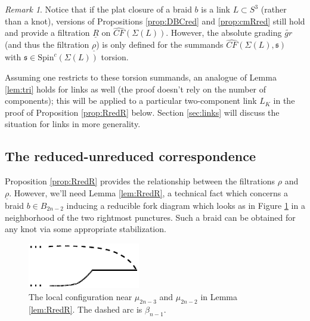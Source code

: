 \documentclass[11pt]{article}
\theoremstyle{plain} \newtheorem{thm}{Theorem}[subsection]
\theoremstyle{plain} \newtheorem{cor}[thm]{Corollary}
\theoremstyle{plain} \newtheorem{prop}[thm]{Proposition}
\theoremstyle{plain} \newtheorem{conj}[thm]{Conjecture}
\theoremstyle{plain} \newtheorem{lem}[thm]{Lemma}
\theoremstyle{definition} \newtheorem{df}[thm]{Definition}
\theoremstyle{remark} \newtheorem{rmk}[thm]{Remark}
\theoremstyle{remark} \newtheorem{obs}[thm]{Observation}
\newcommand{\B}[1]{B_{#1} }
\newcommand{\DBC}[1]{\Sigma(#1)}
\newcommand{\tld}[1]{\widetilde{#1}}
\newcommand{\red}[1]{\underline{#1}}
\numberwithin{equation}{section}
\begin{document}
\begin{rmk}\label{rmk:links}
Notice that if the plat closure of a braid $b$ is a link $L \subset S^3$ (rather than a knot), versions of Propositions \ref{prop:DBCred} and \ref{prop:cmRred} still hold and provide a filtration $\red{R}$ on $\widehat{CF}(\DBC{L})$.  However, the absolute grading $\tld{gr}$ (and thus the filtration $\red{\rho}$) is only defined for the summands $\widehat{CF}(\DBC{L},\mathfrak{s})$ with $\mathfrak{s} \in \text{Spin}^c(\DBC{L})$ torsion.

Assuming one restricts to these torsion summands, an analogue of Lemma \ref{lem:tri} holds for links as well (the proof doesn't rely on the number of components); this will be applied to a particular two-component link $L_K$ in the proof of Proposition \ref{prop:RredR} below.  
Section \ref{sec:links} will discuss the situation for links in more generality.
\end{rmk}

\subsection{The reduced-unreduced correspondence}\label{sec:RredR}

Proposition \ref{prop:RredR} provides the relationship between the filtrations $\rho$ and $\red{\rho}$.  However, we'll need Lemma \ref{lem:RredR}, a technical fact which concerns a braid $b \in \B{2n-2}$ inducing a reducible fork diagram which looks as in Figure \ref{fig:redfork} in a neighborhood of the two rightmost punctures.  Such a braid can be obtained for any knot via some appropriate stabilization.

\begin{figure}[h!]
\centering
\begin{minipage}[c]{.40\linewidth}
\includegraphics[height = 20mm]{RedFork}
\end{minipage}
\begin{minipage}[c]{.55\linewidth}
\caption[A fork diagram for comparing reduced and unreduced theories]{The local configuration near $\mu_{2n-3}$ and $\mu_{2n-2}$ in Lemma \ref{lem:RredR}.  The dashed arc is $\beta_{n-1}$.}
\label{fig:redfork}
\end{minipage}
\end{figure}
\end{document}
